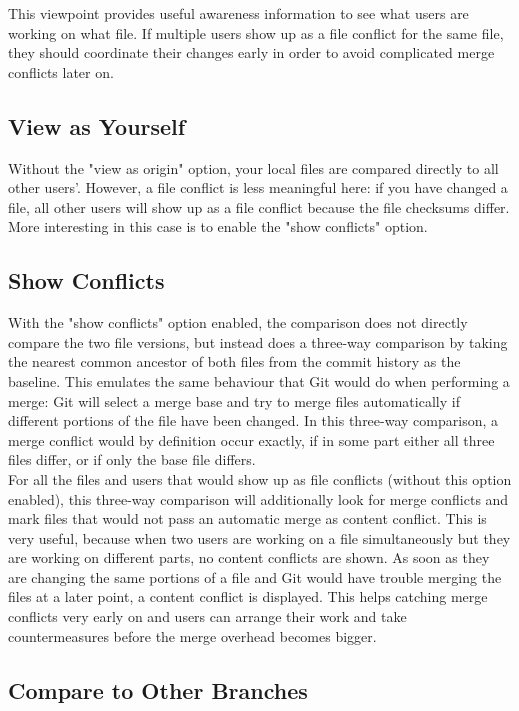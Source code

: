 This viewpoint provides useful awareness information to see what users are working on what file. If multiple users show up as a file conflict for the same file, they should coordinate their changes early in order to avoid complicated merge conflicts later on.

\subsection{View as Yourself}

Without the "view as origin" option, your local files are compared directly to all other users'. However, a file conflict is less meaningful here: if you have changed a file, all other users will show up as a file conflict because the file checksums differ. More interesting in this case is to enable the "show conflicts" option.

\subsection{Show Conflicts}

With the "show conflicts" option enabled, the comparison does not directly compare the two file versions, but instead does a three-way comparison by taking the nearest common ancestor of both files from the commit history as the baseline. This emulates the same behaviour that Git would do when performing a merge: Git will select a merge base and try to merge files automatically if different portions of the file have been changed. In this three-way comparison, a merge conflict would by definition occur exactly, if in some part either all three files differ, or if only the base file differs. \\

For all the files and users that would show up as file conflicts (without this option enabled), this three-way comparison will additionally look for merge conflicts and mark files that would not pass an automatic merge as content conflict. This is very useful, because when two users are working on a file simultaneously but they are working on different parts, no content conflicts are shown. As soon as they are changing the same portions of a file and Git would have trouble merging the files at a later point, a content conflict is displayed. This helps catching merge conflicts very early on and users can arrange their work and take countermeasures before the merge overhead becomes bigger.

\subsection{Compare to Other Branches}


